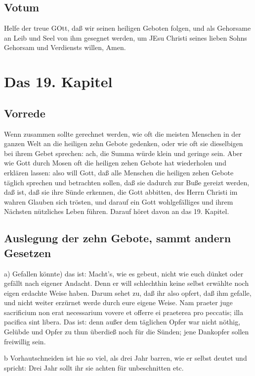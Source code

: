 \section{Votum}

Helfe der treue GOtt, daß wir seinen heiligen Geboten folgen, und als Gehorsame an Leib und Seel von ihm gesegnet werden, um JEsu Christi seines lieben Sohns Gehorsam und Verdiensts willen, Amen.

\chapter{Das 19. Kapitel}

\section{Vorrede}

Wenn zusammen sollte gerechnet werden, wie oft die meisten Menschen in der ganzen Welt an die heiligen zehn Gebote gedenken, oder wie
oft sie dieselbigen bei ihrem Gebet sprechen: ach, die Summa würde klein und geringe sein. Aber wie Gott durch Mosen oft die heiligen zehen Gebote hat wiederholen und erklären lassen: also will Gott, daß alle Menschen die heiligen zehen Gebote täglich sprechen und betrachten sollen, daß sie dadurch zur Buße gereizt werden, daß ist, daß sie ihre Sünde erkennen, die Gott abbitten, des Herrn Christi im wahren Glauben sich trösten, und darauf ein Gott wohlgefälliges und ihrem Nächsten nützliches Leben führen. Darauf höret davon an das 19. Kapitel.

\section{Auslegung der zehn Gebote, sammt andern Gesetzen}

a) Gefallen könnte) das ist: Macht's, wie es gebeut, nicht wie euch dünket oder gefällt nach eigener Andacht. Denn er will schlechthin keine selbst erwählte noch eigen erdachte Weise haben. Darum sehet zu, daß ihr also opfert, daß ihm gefalle, und nicht weiter erzürnet werde durch eure eigene Weise. Nam praeter juge sacrificium non erat necessarium vovere et offerre ei praeterea pro peccatis; illa pacifica sint libera. Das ist: denn außer dem täglichen Opfer war nicht nöthig, Gelübde und Opfer zu thun überdieß noch für die Sünden; jene Dankopfer sollen freiwillig sein.

b Vorhautschneiden ist hie so viel, als drei Jahr barren, wie er selbst deutet und spricht: Drei Jahr sollt ihr sie achten für unbeschnitten etc.

